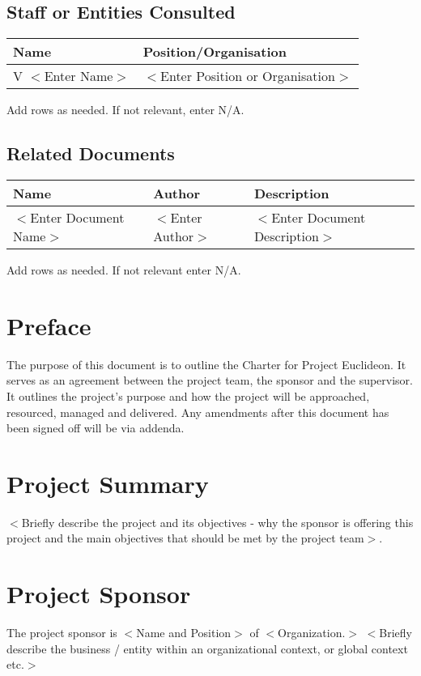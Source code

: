 \documentclass[a4paper]{article}
\def\project{Euclideon}
\begin{document}
\subsection*{Staff or Entities Consulted}
\begin{tabularx}{\textwidth}{|X|X|}
  \hline\rowcolor{table_header} Name & Position/Organisation\\
  \hline V $<$Enter Name$>$ & $<$Enter Position or Organisation$>$\\
\hline\end{tabularx}
Add rows as needed. If not relevant, enter N/A.
\subsection*{Related Documents}
\begin{tabularx}{\textwidth}{|X|X|X|}
  \hline\rowcolor{table_header} Name & Author & Description\\
  \hline $<$Enter Document Name$>$ & $<$Enter Author$>$ & $<$Enter Document Description$>$\\
\hline\end{tabularx}
Add rows as needed. If not relevant enter N/A.

\newpage
\section*{Preface}
The purpose of this document is to outline the Charter for Project \project. It serves as an agreement between the project team, the sponsor and the supervisor. It outlines the project’s purpose and how the project will be approached, resourced, managed and delivered.  Any amendments after this document has been signed off will be via addenda.

\hypertarget{contents}{}
\tableofcontents
\newpage

\section{Project Summary}
$<$Briefly describe the project and its objectives - why the sponsor is offering this project and the main objectives that should be met by the project team$>$.

\section{Project Sponsor}
The project sponsor is $<$Name and Position$>$ of $<$Organization.$>$ $<$Briefly describe the business / entity within an organizational context, or global context etc.$>$
\end{document}
